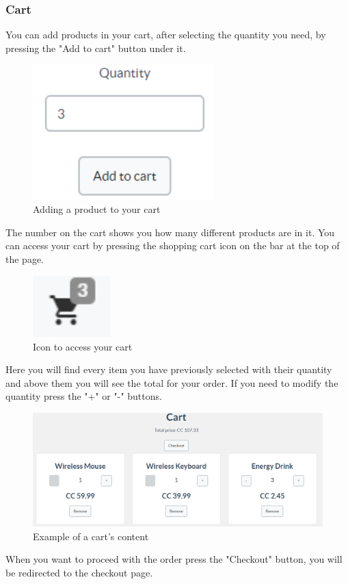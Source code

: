 	\subsubsection{Cart}
	You can add products in your cart, after selecting the quantity you need, 
	by pressing the "Add to cart" button under it.
	\begin{figure}[H]
		\includegraphics[width=7cm]{res/images/add_to_cart.png}
		\centering
		\caption{Adding a product to your cart}
	\end{figure}
	\noindent The number on the cart shows you how many different products are 
	in it. You can access your cart by pressing the shopping cart icon on 
	the bar at the top of the page.
	\begin{figure}[H]
		\includegraphics[width=3cm]{res/images/cart_icon.png}
		\centering
		\caption{Icon to access your cart}
	\end{figure}
	\noindent Here you will find every item you have previously selected with 
	their quantity and above them you will see the total for your order.
	If you need to modify the quantity press the "+" or "-" buttons. \\
	\begin{figure}[H]
		\includegraphics[width=15cm]{res/images/cart_example.png}
		\centering
		\caption{Example of a cart's content}
	\end{figure}
	\noindent When you want to proceed with the order press the "Checkout" button, 
	you will be redirected to the checkout page.
